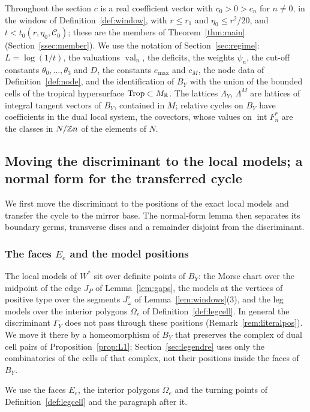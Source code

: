 Throughout the section $c$ is a real coefficient vector with $c_0>0>c_n$ for $n\ne0$, in the window of
Definition~\ref{def:window}, with $r\le r_1$ and $\eta_0\le r^2/20$, and $t<t_0(r,\eta_0,\mathscr C_0)$; these are the
members of Theorem~\ref{thm:main} (Section~\ref{ssec:member}). We use the notation of Section~\ref{sec:regime}: $L=\log(1/t)$, the valuations
$\operatorname{val}_n$, the deficits, the weights $\psi_n$, the cut-off constants $\theta_0,\dots,\theta_3$ and $D$,
the constants $e_{\max}$ and $c_M$, the node data of Definition~\ref{def:node}, and the identification of $B_Y$ with the
union of the bounded cells of the tropical hypersurface $\operatorname{Trop}\subset M_\mathbb R$. The lattices $\Lambda_Y$,
$\Lambda^M$ are lattices of integral tangent vectors of $B_Y$, contained in $M$; relative cycles on $B_Y$ have
coefficients in the dual local system, the covectors, whose values on $\operatorname{int}F^*_n$ are the classes in
$N/\mathbb Z n$ of the elements of $N$.

\subsection{Moving the discriminant to the local models; a normal form for the transferred cycle}\label{ssec:lift-model}

We first move the discriminant to the positions of the exact local models and transfer the cycle to the mirror base.
The normal-form lemma then separates its boundary germs, transverse discs and a remainder disjoint from the discriminant.

\subsubsection*{The faces \texorpdfstring{$E_e$}{Ee} and the model positions}
The local models of $W^*$ sit over definite points of $B_Y$: the Morse chart over the midpoint of the edge $J_P$ of
Lemma~\ref{lem:gaps}, the models at the vertices of positive type over the segments $J^\flat_\omega$ of
Lemma~\ref{lem:windows}(3), and the leg models over the interior polygons $\Omega_e$ of Definition~\ref{def:legcell}. In general the discriminant $\Gamma_Y$
does not pass through these positions (Remark~\ref{rem:literalpos}). We move it there by a homeomorphism of $B_Y$ that
preserves the complex of dual cell pairs of Proposition~\ref{prop:L1}; Section~\ref{sec:legendre} uses only the combinatorics of
the cells of that complex, not their positions inside the faces of $B_Y$.

We use the faces $E_e$, the interior polygons $\Omega_e$ and the turning points of Definition~\ref{def:legcell} and the
paragraph after it.

